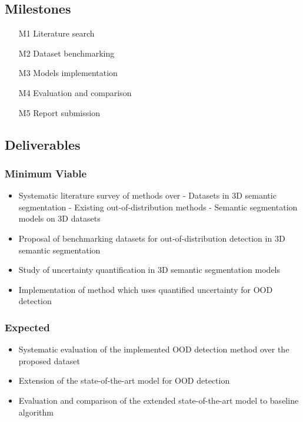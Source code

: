 \documentclass[thesis]{mas_proposal}
\begin{document}

\subsection{Milestones}
\begin{enumerate}
    \item[M1] Literature search
    \item[M2] Dataset benchmarking
    \item[M3] Models implementation
    \item[M4] Evaluation and comparison
    \item[M5] Report submission
\end{enumerate}



\subsection{Deliverables}
\subsubsection*{Minimum Viable}

\begin{itemize}
    \item Systematic literature survey of methods over
        \subitem- Datasets in 3D semantic segmentation
        \subitem- Existing out-of-distribution methods 
        \subitem- Semantic segmentation models on 3D datasets
    \item Proposal of benchmarking datasets for out-of-distribution detection in 3D semantic
    segmentation
    \item Study of uncertainty quantification in 3D semantic segmentation models
    \item Implementation of method which uses quantified uncertainty for OOD detection
\end{itemize}

\subsubsection*{Expected}
\begin{itemize}
    \item Systematic evaluation of the implemented OOD detection method over the
    proposed dataset
    \item Extension of the state-of-the-art model for OOD detection
    \item Evaluation and comparison of the extended state-of-the-art model to baseline algorithm
\end{itemize}
\end{document}
